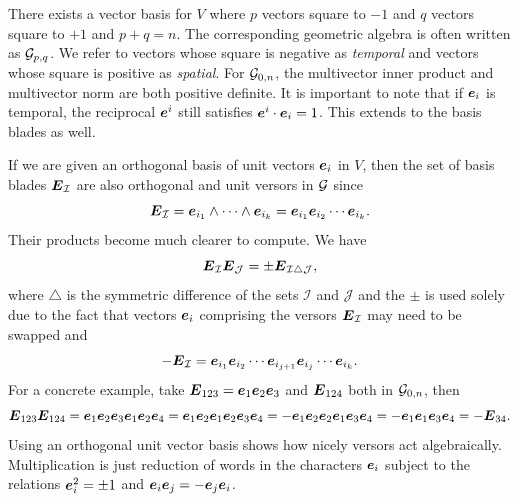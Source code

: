 \documentclass{article}
\begin{document}
There exists a vector basis for $V$ where $p$ vectors square to $-1$ and $q$ vectors square to $+1$ and $p+q=n$. The corresponding geometric algebra is often written as $\mathcal{G}_{p,q}$. We refer to vectors whose square is negative as \emph{temporal} and vectors whose square is positive as \emph{spatial}. For $\mathcal{G}_{0,n}$, the multivector inner product and multivector norm are both positive definite. It is important to note that if $\boldsymbol{e}_i$ is temporal, the reciprocal $\boldsymbol{e}^i$ still satisfies $\boldsymbol{e}^i \cdot \boldsymbol{e}_i=1$. This extends to the basis blades as well.

If we are given an orthogonal basis of unit vectors $\boldsymbol{e}_i$ in $V$, then the set of basis blades $\boldsymbol{E}_\mathcal{I}$ are also orthogonal and unit versors in $\mathcal{G}$ since
\begin{equation}
\boldsymbol{E}_\mathcal{I} = \boldsymbol{e}_{i_1}\wedge \cdots \wedge \boldsymbol{e}_{i_k} = \boldsymbol{e}_{i_1} \boldsymbol{e}_{i_2} \cdots \boldsymbol{e}_{i_k}.
\end{equation}
Their products become much clearer to compute. We have
\begin{equation}
\boldsymbol{E}_\mathcal{I} \boldsymbol{E}_\mathcal{J} =  \pm \boldsymbol{E}_{\mathcal{I}\triangle \mathcal{J}},
\end{equation}
where $\triangle$ is the symmetric difference of the sets $\mathcal{I}$ and $\mathcal{J}$ and the $\pm$ is used solely due to the fact that vectors $\boldsymbol{e}_i$ comprising the versors $\boldsymbol{E}_\mathcal{I}$ may need to be swapped and
\begin{equation}
-\boldsymbol{E}_\mathcal{I} = \boldsymbol{e}_{i_1} \boldsymbol{e}_{i_2} \cdots \boldsymbol{e}_{i_{j+1}} \boldsymbol{e}_{i_j}\cdots \boldsymbol{e}_{i_k}.
\end{equation}
For a concrete example, take $\boldsymbol{E}_{123}=\boldsymbol{e}_1\boldsymbol{e}_2\boldsymbol{e}_3$ and $\boldsymbol{E}_{124}$ both in $\mathcal{G}_{0,n}$, then
\begin{equation}
\boldsymbol{E}_{123}\boldsymbol{E}_{124}= \boldsymbol{e}_1\boldsymbol{e}_2\boldsymbol{e}_3\boldsymbol{e}_1\boldsymbol{e}_2\boldsymbol{e}_4=\boldsymbol{e}_1\boldsymbol{e}_2\boldsymbol{e}_1\boldsymbol{e}_2\boldsymbol{e}_3\boldsymbol{e}_4 = -\boldsymbol{e}_1\boldsymbol{e}_2\boldsymbol{e}_2\boldsymbol{e}_1\boldsymbol{e}_3\boldsymbol{e}_4 = -\boldsymbol{e}_1\boldsymbol{e}_1\boldsymbol{e}_3\boldsymbol{e}_4 = -\boldsymbol{E}_{34}.
\end{equation}
Using an orthogonal unit vector basis shows how nicely versors act algebraically. Multiplication is just reduction of words in the characters $\boldsymbol{e}_i$ subject to the relations $\boldsymbol{e}_i^2=\pm 1$ and $\boldsymbol{e}_i\boldsymbol{e}_j=-\boldsymbol{e}_j\boldsymbol{e}_i$.
\end{document}
